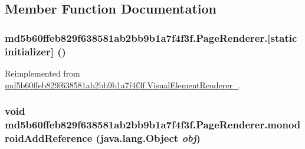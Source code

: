\subsection{Member Function Documentation}
\hypertarget{classmd5b60ffeb829f638581ab2bb9b1a7f4f3f_1_1_page_renderer_2f982e94f2717d053a64b84bfc473ebe}{
\subsubsection[{[static initializer]}]{\setlength{\rightskip}{0pt plus 5cm}md5b60ffeb829f638581ab2bb9b1a7f4f3f.PageRenderer.\mbox{[}static initializer\mbox{]} ()}}
\label{classmd5b60ffeb829f638581ab2bb9b1a7f4f3f_1_1_page_renderer_2f982e94f2717d053a64b84bfc473ebe}




Reimplemented from \hyperlink{classmd5b60ffeb829f638581ab2bb9b1a7f4f3f_1_1_visual_element_renderer__1_3ae26bd8575212fb6d6f14487b4f48d4}{md5b60ffeb829f638581ab2bb9b1a7f4f3f.VisualElementRenderer\_}.\hypertarget{classmd5b60ffeb829f638581ab2bb9b1a7f4f3f_1_1_page_renderer_89f8e358b3bf48337c91fc57b5aa1a1e}{
\subsubsection[{monodroidAddReference}]{\setlength{\rightskip}{0pt plus 5cm}void md5b60ffeb829f638581ab2bb9b1a7f4f3f.PageRenderer.monodroidAddReference (java.lang.Object {\em obj})}}
\label{classmd5b60ffeb829f638581ab2bb9b1a7f4f3f_1_1_page_renderer_89f8e358b3bf48337c91fc57b5aa1a1e}




